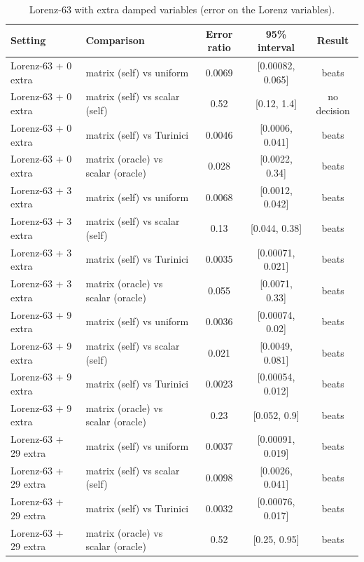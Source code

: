 \begin{table}[H]\centering\small
\caption{Lorenz-63 with extra damped variables (error on the Lorenz variables).}
\begin{tabular}{llccc}\toprule
Setting & Comparison & Error ratio & 95\% interval & Result\\\midrule
Lorenz-63 + 0 extra & matrix (self) vs uniform & 0.0069 & [0.00082, 0.065] & beats\\
Lorenz-63 + 0 extra & matrix (self) vs scalar (self) & 0.52 & [0.12, 1.4] & no decision\\
Lorenz-63 + 0 extra & matrix (self) vs Turinici & 0.0046 & [0.0006, 0.041] & beats\\
Lorenz-63 + 0 extra & matrix (oracle) vs scalar (oracle) & 0.028 & [0.0022, 0.34] & beats\\
Lorenz-63 + 3 extra & matrix (self) vs uniform & 0.0068 & [0.0012, 0.042] & beats\\
Lorenz-63 + 3 extra & matrix (self) vs scalar (self) & 0.13 & [0.044, 0.38] & beats\\
Lorenz-63 + 3 extra & matrix (self) vs Turinici & 0.0035 & [0.00071, 0.021] & beats\\
Lorenz-63 + 3 extra & matrix (oracle) vs scalar (oracle) & 0.055 & [0.0071, 0.33] & beats\\
Lorenz-63 + 9 extra & matrix (self) vs uniform & 0.0036 & [0.00074, 0.02] & beats\\
Lorenz-63 + 9 extra & matrix (self) vs scalar (self) & 0.021 & [0.0049, 0.081] & beats\\
Lorenz-63 + 9 extra & matrix (self) vs Turinici & 0.0023 & [0.00054, 0.012] & beats\\
Lorenz-63 + 9 extra & matrix (oracle) vs scalar (oracle) & 0.23 & [0.052, 0.9] & beats\\
Lorenz-63 + 29 extra & matrix (self) vs uniform & 0.0037 & [0.00091, 0.019] & beats\\
Lorenz-63 + 29 extra & matrix (self) vs scalar (self) & 0.0098 & [0.0026, 0.041] & beats\\
Lorenz-63 + 29 extra & matrix (self) vs Turinici & 0.0032 & [0.00076, 0.017] & beats\\
Lorenz-63 + 29 extra & matrix (oracle) vs scalar (oracle) & 0.52 & [0.25, 0.95] & beats\\
\bottomrule\end{tabular}\end{table}

